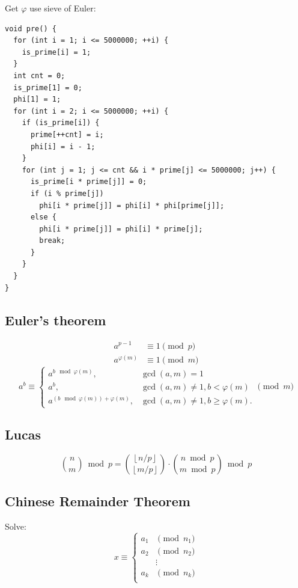 \documentclass[9pt,landscape]{article}
\begin{document}
\begin{multicols}{2}
Get $\varphi$ use sieve of Euler:

\begin{lstlisting}
void pre() {
  for (int i = 1; i <= 5000000; ++i) {
    is_prime[i] = 1;
  }
  int cnt = 0;
  is_prime[1] = 0;
  phi[1] = 1;
  for (int i = 2; i <= 5000000; ++i) {
    if (is_prime[i]) {
      prime[++cnt] = i;
      phi[i] = i - 1;
    }
    for (int j = 1; j <= cnt && i * prime[j] <= 5000000; j++) {
      is_prime[i * prime[j]] = 0;
      if (i % prime[j])
        phi[i * prime[j]] = phi[i] * phi[prime[j]];
      else {
        phi[i * prime[j]] = phi[i] * prime[j];
        break;
      }
    }
  }
}
\end{lstlisting}

\subsection{Euler's theorem}
\begin{align*}
a^{p - 1}&\equiv 1\pmod p\\
a^{\varphi(m)}&\equiv 1\pmod m
\end{align*}
\begin{equation*}
a^b\equiv
\begin{cases}
a^{b\mod\varphi(m)},&\gcd(a, m)=1\\
a^b,&\gcd(a,m)\neq 1,b<\varphi(m)\\
a^{(b\mod\varphi(m))+\varphi(m)},&\gcd(a,m)\neq 1,b\ge\varphi(m).
\end{cases}\pmod m
\end{equation*}

\subsection{Lucas}
$$
\binom{n}{m}\bmod p = \binom{\left\lfloor n/p \right\rfloor}{\left\lfloor m/p\right\rfloor}\cdot\binom{n\bmod p}{m\bmod p}\bmod p
$$

\subsection{Chinese Remainder Theorem}
Solve:
\begin{equation*}
x\equiv
\begin{cases}
a_1&\pmod{n_1}\\
a_2&\pmod{n_2}\\
&\vdots\\
a_k&\pmod{n_k}\\
\end{cases}
\end{equation*}


\end{multicols}
\end{document}
